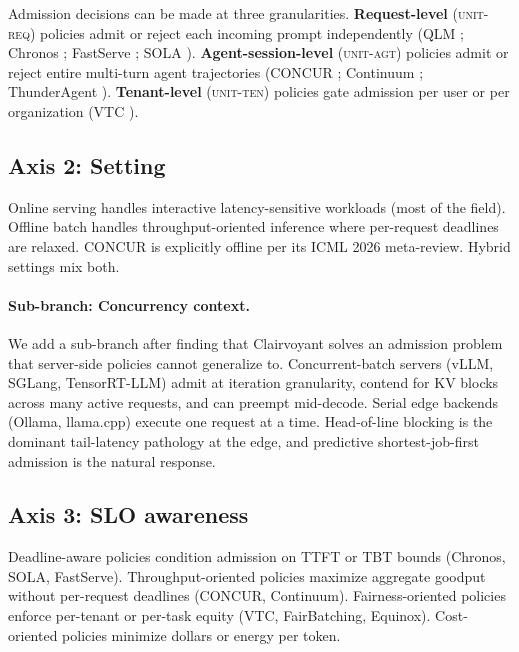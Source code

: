 Admission decisions can be made at three granularities.
\textbf{Request-level} (\textsc{unit-req}) policies admit or reject
each incoming prompt independently (QLM \citep{patke2024qlm}; Chronos
\citep{marref2026chronos}; FastServe \citep{wu2026fastserve}; SOLA
\citep{hong2025sola}). \textbf{Agent-session-level} (\textsc{unit-agt})
policies admit or reject entire multi-turn agent trajectories (CONCUR
\citep{chen2026concur}; Continuum \citep{li2026continuum}; ThunderAgent
\citep{kang2026thunderagent}). \textbf{Tenant-level} (\textsc{unit-ten})
policies gate admission per user or per organization (VTC
\citep{sheng2024vtc}).

\subsection{Axis 2: Setting}

Online serving handles interactive latency-sensitive workloads (most
of the field). Offline batch handles throughput-oriented inference
where per-request deadlines are relaxed. CONCUR is explicitly offline
per its ICML 2026 meta-review. Hybrid settings mix both.

\paragraph{Sub-branch: Concurrency context.}
We add a sub-branch after finding that Clairvoyant
\citep{sundaresan2026clairvoyant} solves an admission problem that
server-side policies cannot generalize to. Concurrent-batch servers
(vLLM, SGLang, TensorRT-LLM) admit at iteration granularity, contend
for KV blocks across many active requests, and can preempt mid-decode.
Serial edge backends (Ollama, llama.cpp) execute one request at a
time. Head-of-line blocking is the dominant tail-latency pathology at
the edge, and predictive shortest-job-first admission is the natural
response.

\subsection{Axis 3: SLO awareness}

Deadline-aware policies condition admission on TTFT or TBT bounds
(Chronos, SOLA, FastServe). Throughput-oriented policies maximize
aggregate goodput without per-request deadlines (CONCUR, Continuum).
Fairness-oriented policies enforce per-tenant or per-task equity (VTC,
FairBatching, Equinox). Cost-oriented policies minimize dollars or
energy per token.

